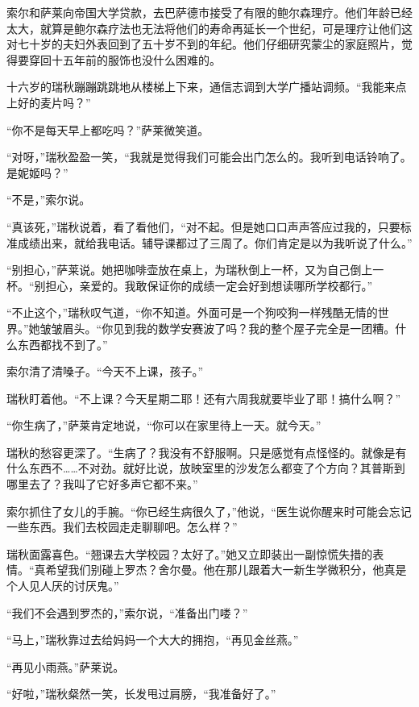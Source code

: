 \documentclass[AutoFakeBold=true]{book}
\begin{document}
\vspace*{1em}

索尔和萨莱向帝国大学贷款，去巴萨德市接受了有限的鲍尔森理疗。他们年龄已经太大，就算是鲍尔森疗法也无法将他们的寿命再延长一个世纪，可是理疗让他们这对七十岁的夫妇外表回到了五十岁不到的年纪。他们仔细研究蒙尘的家庭照片，觉得要穿回十五年前的服饰也没什么困难的。

十六岁的瑞秋蹦蹦跳跳地从楼梯上下来，通信志调到大学广播站调频。``我能来点上好的麦片吗？''

``你不是每天早上都吃吗？''萨莱微笑道。

``对呀，''瑞秋盈盈一笑，``我就是觉得我们可能会出门怎么的。我听到电话铃响了。是妮姬吗？''

``不是，''索尔说。

``真该死，''瑞秋说着，看了看他们，``对不起。但是她口口声声答应过我的，只要标准成绩出来，就给我电话。辅导课都过了三周了。你们肯定是以为我听说了什么。''

``别担心，''萨莱说。她把咖啡壶放在桌上，为瑞秋倒上一杯，又为自己倒上一杯。``别担心，亲爱的。我敢保证你的成绩一定会好到想读哪所学校都行。''

``不止这个，''瑞秋叹气道，``你不知道。外面可是一个狗咬狗一样残酷无情的世界。''她皱皱眉头。``你见到我的数学安赛波了吗？我的整个屋子完全是一团糟。什么东西都找不到了。''

索尔清了清嗓子。``今天不上课，孩子。''

瑞秋盯着他。``不上课？今天星期二耶！还有六周我就要毕业了耶！搞什么啊？''

``你生病了，''萨莱肯定地说，``你可以在家里待上一天。就今天。''

瑞秋的愁容更深了。``生病了？我没有不舒服啊。只是感觉有点怪怪的。就像是有什么东西不……不对劲。就好比说，放映室里的沙发怎么都变了个方向？其普斯到哪里去了？我叫了它好多声它都不来。''

索尔抓住了女儿的手腕。``你已经生病很久了，''他说，``医生说你醒来时可能会忘记一些东西。我们去校园走走聊聊吧。怎么样？''

瑞秋面露喜色。``翘课去大学校园？太好了。''她又立即装出一副惊慌失措的表情。``真希望我们别碰上罗杰？舍尔曼。他在那儿跟着大一新生学微积分，他真是个人见人厌的讨厌鬼。''

``我们不会遇到罗杰的，''索尔说，``准备出门喽？''

``马上，''瑞秋靠过去给妈妈一个大大的拥抱，``再见金丝燕。''

``再见小雨燕。''萨莱说。

``好啦，''瑞秋粲然一笑，长发甩过肩膀，``我准备好了。''
\end{document}
